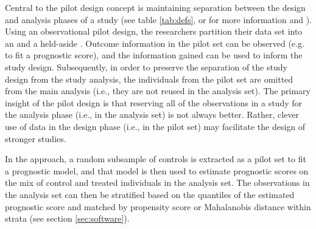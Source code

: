 Central to the pilot design concept is maintaining separation between the design and analysis phases of a study (see table \ref{tab:defs}, or for more information \citet{goodman2017designthinking} and \citet{rubin2008design}). Using an observational pilot design, the researchers partition their data set into an  and a held-aside . Outcome information in the pilot set can be observed (e.g. to fit a prognostic score), and the information gained can be used to inform the study design. Subsequently, in order to preserve the separation of the study design from the study analysis, the individuals from the pilot set are omitted from the main analysis (i.e., they are not reused in the analysis set). The primary insight of the pilot design is that reserving all of the observations in a study for the analysis phase (i.e., in the analysis set) is not always better.  Rather, clever use of data in the design phase (i.e., in the pilot set) may facilitate the design of stronger studies.

In the  approach, a random subsample of controls is extracted as a pilot set to fit a prognostic model, and that model is then used to estimate prognostic scores on the mix of control and treated individuals in the analysis set.  The observations in the analysis set can then be stratified based on the quantiles of the estimated prognostic score and matched by propensity score or Mahalanobis distance within strata (see section \ref{sec:software}).

